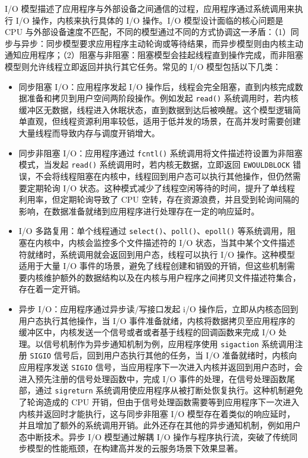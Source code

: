 I/O 模型描述了应用程序与外部设备之间通信的过程，应用程序通过系统调用来执行 I/O 操作，内核来执行具体的 I/O 操作。I/O 模型设计面临的核心问题是 CPU 与外部设备速度不匹配，不同的模型通过不同的方式协调这一矛盾：（1）同步与异步：同步模型要求应用程序主动轮询或等待结果，而异步模型则由内核主动通知应用程序；（2）阻塞与非阻塞：阻塞模型会挂起线程直到操作完成，而非阻塞模型则允许线程立即返回并执行其它任务。常见的 I/O 模型包括以下几类：

\begin{itemize}
    \item 同步阻塞 I/O：应用程序发起 I/O 操作后，线程会完全阻塞，直到内核完成数据准备和拷贝到用户空间两阶段操作。例如发起 \verb|read()| 系统调用时，若内核缓冲区无数据，线程进入休眠状态，直到数据到达后被唤醒。这个模型逻辑简单直观，但线程资源利用率较低，适用于低并发的场景，在高并发时需要创建大量线程而导致内存与调度开销增大。
    
    \item 同步非阻塞 I/O：应用程序通过 \verb|fcntl()| 系统调用将文件描述符设置为非阻塞模式，当发起 \verb|read()| 系统调用时，若内核无数据，立即返回 \verb|EWOULDBLOCK| 错误，不会将线程阻塞在内核中，线程回到用户态可以执行其他操作，但仍然需要定期轮询 I/O 状态。这种模式减少了线程空闲等待的时间，提升了单线程利用率，但定期轮询导致了 CPU 空转，存在资源浪费，并且受到轮询间隔的影响，在数据准备就绪到应用程序进行处理存在一定的响应延时。
    
    \item I/O 多路复用：单个线程通过 \verb|select()|、\verb|poll()|、\verb|epoll()| 等系统调用，阻塞在内核中，内核会监控多个文件描述符的 I/O 状态，当其中某个文件描述符就绪时，系统调用就会返回到用户态，线程可以执行 I/O 操作。这种模型适用于大量 I/O 事件的场景，避免了线程创建和销毁的开销，但这些机制需要内核维护额外的数据结构以及在内核与用户程序之间拷贝文件描述符集合，存在着一定开销。
    
    \item 异步 I/O：应用程序通过异步读/写接口发起 i/O 操作后，立即从内核态回到用户态执行其他操作，当 I/O 事件准备就绪，内核将数据拷贝至应用程序的缓冲区中，内核发送一个信号或者或者基于线程的回调函数来完成 I/O 处理。以信号机制作为异步通知机制为例，应用程序使用 \verb|sigaction| 系统调用注册 \verb|SIGIO| 信号后，回到用户态执行其他的任务，当 I/O 准备就绪时，内核向应用程序发送 \verb|SIGIO| 信号，当应用程序下一次进入内核并返回到用户态时，会进入预先注册的信号处理函数中，完成 I/O 事件的处理，在信号处理函数尾部，通过 \verb|sigreturn| 系统调用使应用程序从被打断处恢复执行。这种机制避免了轮询造成的 CPU 开销，但由于信号处理函数需要等到应用程序下一次进入内核并返回时才能执行，这与同步非阻塞 I/O 模型存在着类似的响应延时，并且增加了额外的系统调用开销。此外还存在其他的异步通知机制，例如用户态中断技术。异步 I/O 模型通过解耦 I/O 操作与程序执行流，突破了传统同步模型的性能瓶颈，在构建高并发的云服务场景下效果显著。
    
\end{itemize}

